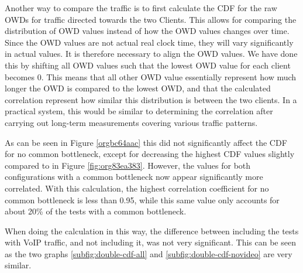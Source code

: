 \documentclass[a4paper,11pt]{article}
\begin{document}
Another way to compare the traffic is to first calculate the CDF for the raw OWDs for traffic directed towards the two Clients. This allows for comparing the distribution of OWD values instead of how the OWD values changes over time. Since the OWD values are not actual real clock time, they will vary significantly in actual values. It is therefore necessary to align the OWD values. We have done this by shifting all OWD values such that the lowest OWD value for each client becomes 0. This means that all other OWD value essentially represent how much longer the OWD is compared to the lowest OWD, and that the calculated correlation represent how similar this distribution is between the two clients. In a practical system, this would be similar to determining the correlation after carrying out long-term measurements covering various traffic patterns.

As can be seen in Figure \ref{orgbc64aac} this did not significantly affect the CDF for no common bottleneck, except for decreasing the highest CDF values slightly compared to in Figure \ref{fig:org83ea383}. However, the values for both configurations with a common bottleneck now appear significantly more correlated. With this calculation, the highest correlation coefficient for no common bottleneck is less than 0.95, while this same value only accounts for about 20\% of the tests with a common bottleneck.

When doing the calculation in this way, the difference between including the tests with VoIP traffic, and not including it, was not very significant. This can be seen as the two graphs \ref{subfig:double-cdf-all} and \ref{subfig:double-cdf-novideo} are very similar.
\end{document}
